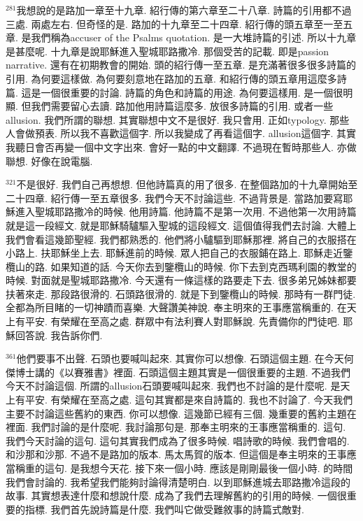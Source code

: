 \documentclass{book}
\begin{document}
$^{281}$我想說的是路加一章至十九章.
紹行傳的第六章至二十八章.
詩篇的引用都不過三處.
兩處左右.
但奇怪的是.
路加的十九章至二十四章.
紹行傳的頭五章至一至五章.
是我們稱為accuser of the Psalms quotation.
是一大堆詩篇的引述.
所以十九章是甚麼呢.
十九章是說耶穌進入聖城耶路撒冷.
那個受苦的記載.
即是passion narrative.
還有在初期教會的開始.
頭的紹行傳一至五章.
是充滿著很多很多詩篇的引用.
為何要這樣做.
為何要刻意地在路加的五章.
和紹行傳的頭五章用這麼多詩篇.
這是一個很重要的討論.
詩篇的角色和詩篇的用途.
為何要這樣用.
是一個很明顯.
但我們需要留心去讀.
路加他用詩篇這麼多.
放很多詩篇的引用.
或者一些allusion.
我們所謂的聯想.
其實聯想中文不是很好.
我只會用.
正如typology.
那些人會做預表.
所以我不喜歡這個字.
所以我變成了再看這個字.
allusion這個字.
其實我聽日會否再變一個中文字出來.
會好一點的中文翻譯.
不過現在暫時那些人.
亦做聯想.
好像在說電腦.

$^{321}$不是很好.
我們自己再想想.
但他詩篇真的用了很多.
在整個路加的十九章開始至二十四章.
紹行傳一至五章很多.
我們今天不討論這些.
不過背景是.
當路加要寫耶穌進入聖城耶路撒冷的時候.
他用詩篇.
他詩篇不是第一次用.
不過他第一次用詩篇就是這一段經文.
就是耶穌騎驢驅入聖城的這段經文.
這個值得我們去討論.
大體上我們會看這幾節聖經.
我們都熟悉的.
他們將小驢驅到耶穌那裡.
將自己的衣服搭在小路上.
扶耶穌坐上去.
耶穌進前的時候.
眾人把自己的衣服鋪在路上.
耶穌走近鑒欖山的路.
如果知道的話.
今天你去到鑒欖山的時候.
你下去到克西瑪利園的教堂的時候.
對面就是聖城耶路撒冷.
今天還有一條這樣的路要走下去.
很多弟兄姊妹都要扶著來走.
那段路很滑的.
石頭路很滑的.
就是下到鑒欖山的時候.
那時有一群門徒.
全都為所目睹的一切神蹟而喜樂.
大聲讚美神說.
奉主明來的王事應當稱重的.
在天上有平安.
有榮耀在至高之處.
群眾中有法利賽人對耶穌說.
先責備你的門徒吧.
耶穌回答說.
我告訴你們.

$^{361}$他們要事不出聲.
石頭也要喊叫起來.
其實你可以想像.
石頭這個主題.
在今天何傑博士講的《以賽雅書》裡面.
石頭這個主題其實是一個很重要的主題.
不過我們今天不討論這個.
所謂的allusion石頭要喊叫起來.
我們也不討論的是什麼呢.
是天上有平安.
有榮耀在至高之處.
這句其實都是來自詩篇的.
我也不討論了.
今天我們主要不討論這些舊約的東西.
你可以想像.
這幾節已經有三個.
幾重要的舊約主題在裡面.
我們討論的是什麼呢.
我討論那句是.
那奉主明來的王事應當稱重的.
這句.
我們今天討論的這句.
這句其實我們成為了很多時候.
唱詩歌的時候.
我們會唱的.
和沙那和沙那.
不過不是路加的版本.
馬太馬賀的版本.
但這個是奉主明來的王事應當稱重的這句.
是我想今天花.
接下來一個小時.
應該是剛剛最後一個小時.
的時間我們會討論的.
我希望我們能夠討論得清楚明白.
以到耶穌進城去耶路撒冷這段的故事.
其實想表達什麼和想說什麼.
成為了我們去理解舊約的引用的時候.
一個很重要的指標.
我們首先說詩篇是什麼.
我們叫它做受難敘事的詩篇式敵對.
\end{document}
